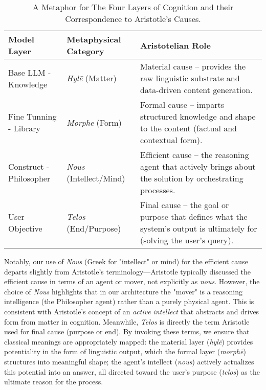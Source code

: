 \documentclass{article}
\begin{document}
\begin{table}[h]
\centering
\caption{A Metaphor for The Four Layers of Cognition and their Correspondence to Aristotle's Causes.}\label{tab:layers}
\begin{tabular}{p{3cm} p{3.5cm} p{6.5cm}}
\hline
\textbf{Model Layer} & \textbf{Metaphysical Category} & \textbf{Aristotelian Role}\\ \hline
Base LLM - Knowledge& \emph{Hylē} (Matter) & Material cause – provides the raw linguistic substrate and data-driven content generation.\\
Fine Tunning - Library& \emph{Morphe} (Form) & Formal cause – imparts structured knowledge and shape to the content (factual and contextual form).\\
Construct - Philosopher& \emph{Nous} (Intellect/Mind) & Efficient cause – the reasoning agent that actively brings about the solution by orchestrating processes.\\
User - Objective& \emph{Telos} (End/Purpose) & Final cause – the goal or purpose that defines what the system's output is ultimately for (solving the user's query).\\ \hline
\end{tabular}
\end{table}

Notably, our use of \textit{Nous} (Greek for "intellect" or mind) for the efficient cause departs slightly from Aristotle's terminology—Aristotle typically discussed the efficient cause in terms of an agent or mover, not explicitly as \emph{nous}. However, the choice of \textit{Nous} highlights that in our architecture the "mover" is a reasoning intelligence (the Philosopher agent) rather than a purely physical agent. This is consistent with Aristotle's concept of an \emph{active intellect} that abstracts and drives form from matter in cognition. Meanwhile, \textit{Telos} is directly the term Aristotle used for final cause (purpose or end). By invoking these terms, we ensure that classical meanings are appropriately mapped: the material layer (\emph{hylē}) provides potentiality in the form of linguistic output, which the formal layer (\emph{morphē}) structures into meaningful shape; the agent's intellect (\emph{nous}) actively actualizes this potential into an answer, all directed toward the user's purpose (\emph{telos}) as the ultimate reason for the process.
\end{document}
